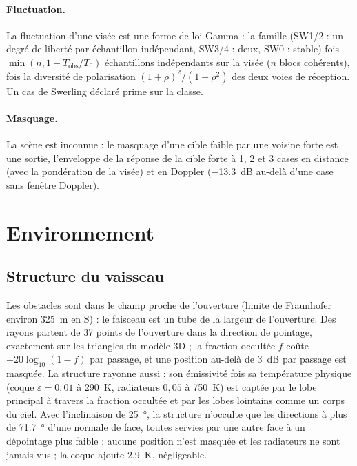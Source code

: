 \documentclass[11pt,a4paper]{article}
\begin{document}
\paragraph{Fluctuation.} La fluctuation d'une visée est une forme de loi Gamma : la famille (SW1/2 : un degré de
liberté par échantillon indépendant, SW3/4 : deux, SW0 : stable) fois $\min(n, 1 + T_{\mathrm{obs}}/T_0)$ échantillons
indépendants sur la visée ($n$ blocs cohérents), fois la diversité de polarisation $(1+\rho)^2/(1+\rho^2)$ des deux
voies de réception. Un cas de Swerling déclaré prime sur la classe.

\paragraph{Masquage.} La scène est inconnue : le masquage d'une cible faible par une voisine forte est une sortie,
l'enveloppe de la réponse de la cible forte à 1, 2 et 3 cases en distance (avec la pondération de la visée) et en
Doppler (\SI{-13.3}{dB} au-delà d'une case sans fenêtre Doppler).

\section{Environnement}\label{sec:env}

\subsection{Structure du vaisseau}
Les obstacles sont dans le champ proche de l'ouverture (limite de Fraunhofer environ \SI{325}{m} en S) : le faisceau
est un tube de la largeur de l'ouverture. Des rayons partent de 37 points de l'ouverture dans la direction de pointage,
exactement sur les triangles du modèle 3D ; la fraction occultée $f$ coûte $-20\log_{10}(1-f)$ par passage, et une
position au-delà de \SI{3}{dB} par passage est masquée. La structure rayonne aussi : son émissivité fois sa
température physique (coque $\varepsilon = 0,01$ à \SI{290}{K}, radiateurs $0,05$ à \SI{750}{K}) est captée par le lobe
principal à travers la fraction occultée et par les lobes lointains comme un corps du ciel. Avec l'inclinaison de
\SI{25}{\degree}, la structure n'occulte que les directions à plus de \SI{71.7}{\degree} d'une normale de face, toutes
servies par une autre face à un dépointage plus faible : aucune position n'est masquée et les radiateurs ne sont jamais
vus ; la coque ajoute \SI{2.9}{K}, négligeable.
\end{document}
